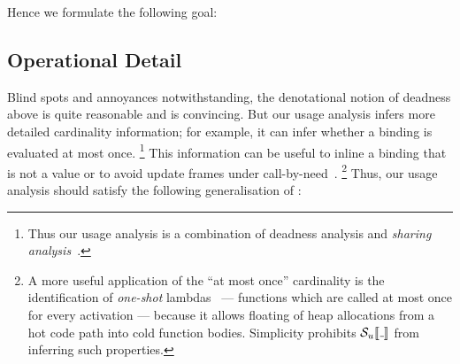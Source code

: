 
Hence we formulate the following goal:


\subsection{Operational Detail}

Blind spots and annoyances notwithstanding, the denotational notion of deadness
above is quite reasonable and  is convincing.
But our usage analysis infers more detailed cardinality information;
for example, it can infer whether a binding is evaluated at most once.%
\footnote{Thus our usage analysis is a combination of deadness analysis
and \emph{sharing analysis}~\citep{Gustavsson:98}.}
This information can be useful to inline a binding that is not a value or
to avoid update frames under call-by-need~\citep{Gustavsson:98,cardinality-ext}.%
\footnote{A more useful application of the ``at most once'' cardinality is the
identification of \emph{one-shot} lambdas~\citep{cardinality-ext} --- functions which are
called at most once for every activation --- because it allows floating of heap
allocations from a hot code path into cold function bodies.
Simplicity prohibits $\semusg{\wild}$ from inferring such properties.}
Thus, our usage analysis should satisfy the following generalisation of
:

